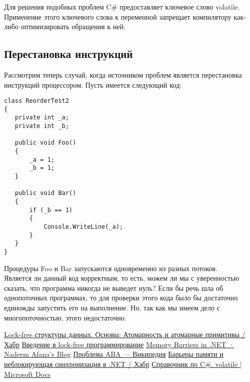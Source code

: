 \documentclass{article}
\begin{document}
Для решения подобных проблем C\# предоставляет ключевое слово volatile. Применение этого ключевого слова к переменной запрещает компилятору как-либо оптимизировать обращения к ней.

\subsection{Перестановка инструкций}

Рассмотрим теперь случай, когда источником проблем является перестановка инструкций процессором.
Пусть имеется следующий код: \\
\begin{lstlisting}
class ReorderTest2
{
   private int _a;
   private int _b;

   public void Foo()
   {
       _a = 1;
       _b = 1;
   }

   public void Bar()
   {
       if (_b == 1)
       {
           Console.WriteLine(_a);
       }
   }
}
\end{lstlisting}

Процедуры Foo и Bar запускаются одновременно из разных потоков. \\

Является ли данный код корректным, то есть, можем ли мы с уверенностью сказать, что программа никогда не выведет нуль? Если бы речь шла об однопоточных программах, то для проверки этого кода было бы достаточно единожды запустить его на выполнение. Но, так как мы имеем дело с многопоточностью, этого недостаточно. 


\begin{thebibliography}{9}
 \href{https://habr.com/ru/post/195948/}{Lock-free структуры данных. Основы: Атомарность и атомарные примитивы / Хабр}
 \href{https://habr.com/ru/company/wunderfund/blog/322094/}{Введение в lock-free программирование}
 \href{https://afana.me/archive/2015/07/10/memory-barriers-in-dot-net.aspx/}{Memory Barriers in .NET · Nadeem Afana's Blog}
 \href{https://ru.wikipedia.org/wiki/%D0%9F%D1%80%D0%BE%D0%B1%D0%BB%D0%B5%D0%BC%D0%B0_ABA}{Проблема ABA — Википедия}
 \href{https://habr.com/ru/post/130318/}{Барьеры памяти и неблокирующая синхронизация в .NET / Хабр}
 \href{https://docs.microsoft.com/ru-ru/dotnet/csharp/language-reference/keywords/volatile}{Справочник по C#. volatile | Microsoft Docs}
\end{thebibliography}
\end{document}
